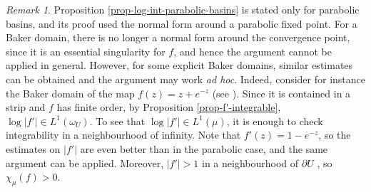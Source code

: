 \documentclass[11pt]{article}
\theoremstyle{definition}
\theoremstyle{remark}
\newtheorem{remark}[thm]{Remark}
\newcounter{main}
\theoremstyle{plain}
\begin{document}
\begin{remark} Proposition \ref{prop-log-int-parabolic-basins} is stated only for parabolic basins, and its proof used the normal form around a parabolic fixed point. For a Baker domain, there is no longer a normal form around the convergence point, since it is an essential singularity for $ f $, and hence the argument cannot be applied in general. However, for some explicit Baker domains, similar estimates can be obtained and the argument may work \textit{ad hoc}.
	Indeed, consider for instance the Baker domain of the map $ f(z)=z+e^{-z} $ (see \cite{FagellaJove}). Since it is contained in a strip and $ f $ has finite order, by Proposition \ref{prop-f'-integrable}, $ \log \left| f'\right| \in L^1(\omega_U) $. To see that $ \log \left| f'\right| \in L^1(\mu) $, it is enough to check integrability in a neighbourhood of infinity. Note that $ f'(z)=1-e^{-z} $, so the estimates on $ \left| f' \right| $ are even better than in the parabolic case, and the same argument can be applied.
	Moreover, $ \left| f'\right| >1 $ in a neighbourhood of $ \partial U $ \cite[Prop. 3.6]{FagellaJove}, so $ \chi_\mu (f)>0 $.
\end{remark}

{\footnotesize}
\end{document}
